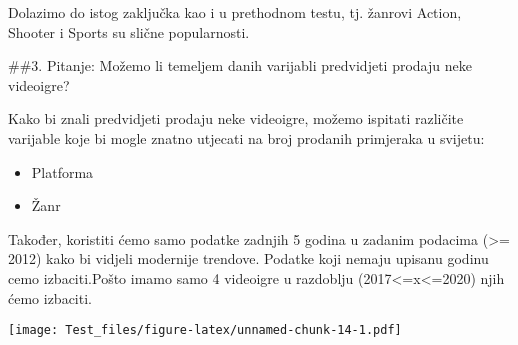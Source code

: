 \documentclass[
]{article}
\newenvironment{Shaded}{\begin{snugshade}}{\end{snugshade}}
\newcommand{\ConstantTok}[1]{\textcolor[rgb]{0.00,0.00,0.00}{#1}}
\newcommand{\DecValTok}[1]{\textcolor[rgb]{0.00,0.00,0.81}{#1}}
\newcommand{\FunctionTok}[1]{\textcolor[rgb]{0.00,0.00,0.00}{#1}}
\newcommand{\NormalTok}[1]{#1}
\newcommand{\OtherTok}[1]{\textcolor[rgb]{0.56,0.35,0.01}{#1}}
\newcommand{\SpecialCharTok}[1]{\textcolor[rgb]{0.00,0.00,0.00}{#1}}
\newcommand{\StringTok}[1]{\textcolor[rgb]{0.31,0.60,0.02}{#1}}
\providecommand{\tightlist}{%
  \setlength{\itemsep}{0pt}\setlength{\parskip}{0pt}}
\begin{document}
Dolazimo do istog zaključka kao i u prethodnom testu, tj. žanrovi
Action, Shooter i Sports su slične popularnosti.

\#\#3. Pitanje: Možemo li temeljem danih varijabli predvidjeti prodaju
neke videoigre?

Kako bi znali predvidjeti prodaju neke videoigre, možemo ispitati
različite varijable koje bi mogle znatno utjecati na broj prodanih
primjeraka u svijetu:

\begin{itemize}
\tightlist
\item
  Platforma
\item
  Žanr
\end{itemize}

Također, koristiti ćemo samo podatke zadnjih 5 godina u zadanim podacima
(\textgreater= 2012) kako bi vidjeli modernije trendove. Podatke koji
nemaju upisanu godinu cemo izbaciti.Pošto imamo samo 4 videoigre u
razdoblju (2017\textless=x\textless=2020) njih ćemo izbaciti.

\begin{Shaded}
\end{Shaded}

\texttt{[image: Test\_files/figure-latex/unnamed-chunk-14-1.pdf]}
\end{document}
